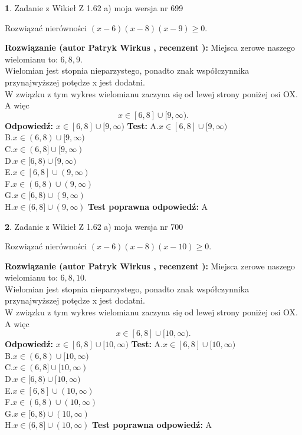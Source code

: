 \documentclass[12pt, a4paper]{article}
\theoremstyle{definition} %
\newtheorem{zad}{}
\newcommand{\zadStart}[1]{\begin{zad}#1\newline}
\newcommand{\zadStop}{\end{zad}}
\newcommand{\rozwStart}[2]{\noindent \textbf{Rozwiązanie (autor #1 , recenzent #2): }\newline}
\newcommand{\rozwStop}{\newline}
\newcommand{\odpStart}{\noindent \textbf{Odpowiedź:}\newline}
\newcommand{\odpStop}{\newline}
\newcommand{\testStart}{\noindent \textbf{Test:}\newline}
\newcommand{\testStop}{\newline}
\newcommand{\kluczStart}{\noindent \textbf{Test poprawna odpowiedź:}\newline}
\newcommand{\kluczStop}{\newline}
\begin{document}
\zadStart{Zadanie z Wikieł Z 1.62 a) moja wersja nr 699}

Rozwiązać nierówności $(x-6)(x-8)(x-9)\ge0$.
\zadStop
\rozwStart{Patryk Wirkus}{}
Miejsca zerowe naszego wielomianu to: $6, 8, 9$.\\
Wielomian jest stopnia nieparzystego, ponadto znak współczynnika przy\linebreak najwyższej potędze x jest dodatni.\\ W związku z tym wykres wielomianu zaczyna się od lewej strony poniżej osi OX. A więc $$x \in [6,8] \cup [9,\infty).$$
\rozwStop
\odpStart
$x \in [6,8] \cup [9,\infty)$
\odpStop
\testStart
A.$x \in [6,8] \cup [9,\infty)$\\
B.$x \in (6,8) \cup [9,\infty)$\\
C.$x \in (6,8] \cup [9,\infty)$\\
D.$x \in [6,8) \cup [9,\infty)$\\
E.$x \in [6,8] \cup (9,\infty)$\\
F.$x \in (6,8) \cup (9,\infty)$\\
G.$x \in [6,8) \cup (9,\infty)$\\
H.$x \in (6,8] \cup (9,\infty)$
\testStop
\kluczStart
A
\kluczStop



\zadStart{Zadanie z Wikieł Z 1.62 a) moja wersja nr 700}

Rozwiązać nierówności $(x-6)(x-8)(x-10)\ge0$.
\zadStop
\rozwStart{Patryk Wirkus}{}
Miejsca zerowe naszego wielomianu to: $6, 8, 10$.\\
Wielomian jest stopnia nieparzystego, ponadto znak współczynnika przy\linebreak najwyższej potędze x jest dodatni.\\ W związku z tym wykres wielomianu zaczyna się od lewej strony poniżej osi OX. A więc $$x \in [6,8] \cup [10,\infty).$$
\rozwStop
\odpStart
$x \in [6,8] \cup [10,\infty)$
\odpStop
\testStart
A.$x \in [6,8] \cup [10,\infty)$\\
B.$x \in (6,8) \cup [10,\infty)$\\
C.$x \in (6,8] \cup [10,\infty)$\\
D.$x \in [6,8) \cup [10,\infty)$\\
E.$x \in [6,8] \cup (10,\infty)$\\
F.$x \in (6,8) \cup (10,\infty)$\\
G.$x \in [6,8) \cup (10,\infty)$\\
H.$x \in (6,8] \cup (10,\infty)$
\testStop
\kluczStart
A
\kluczStop
\end{document}
